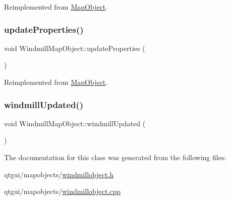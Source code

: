 Reimplemented from \mbox{\hyperlink{class_map_object_ac58ccb02d5d96d934939b217020c822c}{Map\+Object}}.

\mbox{\label{class_windmill_map_object_ad671bf5c0701e0ad71554f563c95a9e6}} 
\subsubsection{\texorpdfstring{updateProperties()}{updateProperties()}}
{\footnotesize\ttfamily void Windmill\+Map\+Object\+::update\+Properties (\begin{DoxyParamCaption}{ }\end{DoxyParamCaption})\hspace{0.3cm}{\ttfamily [virtual]}}



Reimplemented from \mbox{\hyperlink{class_map_object_afa7cd6a4368f4dd077614ac1d983a6c8}{Map\+Object}}.

\mbox{\label{class_windmill_map_object_ab1947abda21e0d89dc0f47381cf0c324}} 
\subsubsection{\texorpdfstring{windmillUpdated()}{windmillUpdated()}}
{\footnotesize\ttfamily void Windmill\+Map\+Object\+::windmill\+Updated (\begin{DoxyParamCaption}{ }\end{DoxyParamCaption})}



The documentation for this class was generated from the following files\+:\begin{DoxyCompactItemize}
\item 
qtgui/mapobjects/\mbox{\hyperlink{windmillobject_8h}{windmillobject.\+h}}\item 
qtgui/mapobjects/\mbox{\hyperlink{windmillobject_8cpp}{windmillobject.\+cpp}}\end{DoxyCompactItemize}
